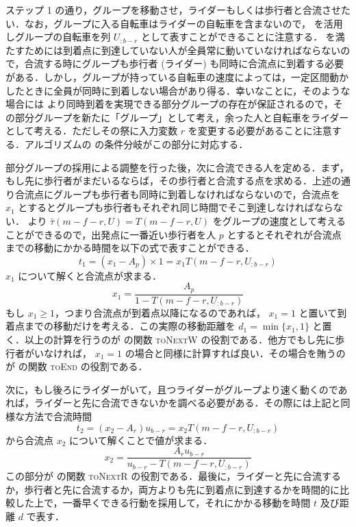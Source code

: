 ステップ 1 の通り，グループを移動させ，ライダーもしくは歩行者と合流させたい．なお，グループに入る自転車はライダーの自転車を含まないので，  を活用しグループの自転車を列 $U_{:b-r}$ として表すことができることに注意する．  を満たすためには到着点に到達していない人が全員常に動いていなければならないので，合流する時にグループも歩行者 (ライダー) も同時に合流点に到着する必要がある．しかし，グループが持っている自転車の速度によっては，一定区間動かしたときに全員が同時に到着しない場合があり得る．幸いなことに，そのような場合には  より同時到着を実現できる部分グループの存在が保証されるので，その部分グループを新たに「グループ」として考え，余った人と自転車をライダーとして考える．ただしその祭に入力変数 $r$ を変更する必要があることに注意する．アルゴリズムの  の条件分岐がこの部分に対応する．

部分グループの採用による調整を行った後，次に合流できる人を定める．まず，もし先に歩行者がまだいるならば，その歩行者と合流する点を求める．上述の通り合流点にグループも歩行者も同時に到着しなければならないので，合流点を $x_1$ とするとグループも歩行者もそれぞれ同じ時間でそこ到達しなければならない．  より $\bar\tau(m - f - r, U) = T(m - f - r, U)$ をグループの速度として考えることができるので，出発点に一番近い歩行者を人 $p$ とするとそれぞれが合流点までの移動にかかる時間を以下の式で表すことができる．
\begin{equation}
  t_1 = (x_1 - A_p) \times 1 = x_1T(m - f - r, U_{:b-r})
\end{equation}
$x_1$ について解くと合流点が求まる．
\begin{equation}
  x_1 = \frac{A_p}{1 - T(m - f - r, U_{:b-r})}
\end{equation}
もし $x_1 \geq 1$，つまり合流点が到着点以降になるのであれば， $x_1 = 1$ と置いて到着点までの移動だけを考える．この実際の移動距離を $d_1 = \min \{x_1, 1\}$ と置く．以上の計算を行うのが  の関数 \textsc{toNextW} の役割である．他方でもし先に歩行者がいなければ， $x_1 = 1$ の場合と同様に計算すれば良い．その場合を賄うのが  の関数 \textsc{toEnd} の役割である．

次に，もし後ろにライダーがいて，且つライダーがグループより速く動くのであれば，ライダーと先に合流できないかを調べる必要がある．その際には上記と同様な方法で合流時間
\begin{equation}
  t_2 = (x_2 - A_r)u_{b - r} = x_2T(m - f - r, U_{:b-r})
\end{equation}
から合流点 $x_2$ について解くことで値が求まる．
\begin{equation}
  x_2 = \frac{A_ru_{b - r}}{u_{b-r} - T(m - f - r, U_{:b-r})}
\end{equation}
この部分が  の関数 \textsc{toNextR} の役割である．最後に，ライダーと先に合流するか，歩行者と先に合流するか，両方よりも先に到着点に到達するかを時間的に比較した上で，一番早くできる行動を採用して，それにかかる移動を時間 $t$ 及び距離 $d$ で表す．


